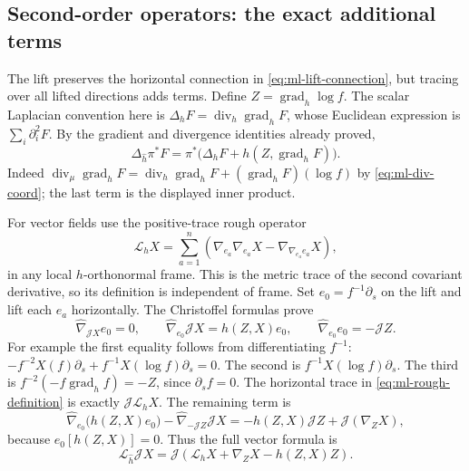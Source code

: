 \subsection{Second-order operators: the exact additional terms}
\label{subsec:ml-second}
The lift preserves the horizontal connection in
\eqref{eq:ml-lift-connection}, but tracing over all lifted directions adds
terms. Define
$Z=\operatorname{grad}_h\log f$. The scalar Laplacian convention here is
$\Delta_h F=\operatorname{div}_h\operatorname{grad}_hF$, whose Euclidean
expression is $\sum_i\partial_i^2F$. By the gradient and divergence
identities already proved,
\begin{equation}\label{eq:ml-scalar-Laplace}
 \Delta_{\widehat h}\pi^*F
   =\pi^*\big(\Delta_hF+h(Z,\operatorname{grad}_hF)\big).
\end{equation}
Indeed $\operatorname{div}_\mu\operatorname{grad}_hF
=\operatorname{div}_h\operatorname{grad}_hF
+(\operatorname{grad}_hF)(\log f)$ by
\eqref{eq:ml-div-coord}; the last term is the displayed inner product.

For vector fields use the positive-trace rough operator
\begin{equation}\label{eq:ml-rough-definition}
 \mathscr L_hX=\sum_{a=1}^n
    \left(\nabla_{e_a}\nabla_{e_a}X-
                        \nabla_{\nabla_{e_a}e_a}X\right),
\end{equation}
in any local $h$-orthonormal frame. This is the metric trace of the
second covariant derivative, so its definition is independent of frame.
Set $e_0=f^{-1}\partial_s$ on the lift and lift each $e_a$ horizontally.
The Christoffel formulas prove
\begin{equation}\label{eq:ml-unit-vertical}
 \widehat\nabla_{\mathcal JX}e_0=0,\qquad
 \widehat\nabla_{e_0}\mathcal JX=h(Z,X)e_0,\qquad
 \widehat\nabla_{e_0}e_0=-\mathcal JZ.
\end{equation}
For example the first equality follows from differentiating $f^{-1}$:
$-f^{-2}X(f)\partial_s+f^{-1}X(\log f)\partial_s=0$.
The second is $f^{-1}X(\log f)\partial_s$.
The third is $f^{-2}(-f\operatorname{grad}_hf)=-Z$, since
$\partial_s f=0$.
The horizontal trace in \eqref{eq:ml-rough-definition} is exactly
$\mathcal J\mathscr L_hX$. The remaining term is
\[
 \widehat\nabla_{e_0}\big(h(Z,X)e_0\big)
   -\widehat\nabla_{-\mathcal JZ}\mathcal JX
   =-h(Z,X)\mathcal JZ+\mathcal J(\nabla_ZX),
\]
because $e_0[h(Z,X)]=0$. Thus the full vector formula is
\begin{equation}\label{eq:ml-rough-lift}
 \mathscr L_{\widehat h}\mathcal JX
  =\mathcal J\left(\mathscr L_hX+\nabla_ZX-h(Z,X)Z\right).
\end{equation}

